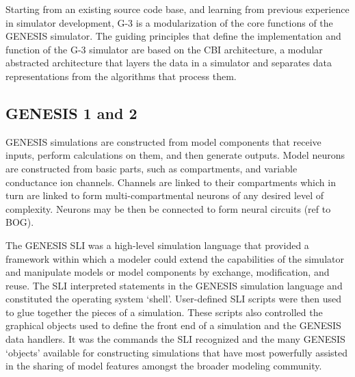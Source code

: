 \documentclass[10pt]{article}
\begin{document}
Starting from an existing source code base, and learning from
previous experience in simulator development, G-3 is a modularization of the core functions of the GENESIS
simulator.  The guiding principles that define the implementation and
function of the G-3 simulator are based on the CBI
architecture, a modular abstracted architecture
that layers the data in a simulator and separates data
representations from the algorithms that process them.

\subsection*{GENESIS 1 and 2}
\label{sec:genesis}


GENESIS simulations are constructed from model components that receive
inputs, perform calculations on them, and then generate outputs. Model
neurons are constructed from basic parts, such as compartments, and
variable conductance ion channels. Channels are linked to their
compartments which in turn are linked to form
multi-compartmental neurons of any desired level of complexity.
Neurons may be then be connected to form neural circuits (ref to BOG). 

The GENESIS SLI was a high-level simulation language that provided a
framework within which a modeler could extend the capabilities of the
simulator and manipulate models or model components by exchange,
modification, and reuse. The SLI interpreted statements in the GENESIS
simulation language and constituted the operating system `shell'.
User-defined SLI scripts were then used to glue together the pieces of
a simulation. These scripts also controlled the graphical objects used
to define the front end of a simulation and the GENESIS data handlers.
It was the commands the SLI recognized and the many GENESIS `objects'
available for constructing simulations that have most powerfully
assisted in the sharing of model features amongst the broader modeling
community.
\end{document}
